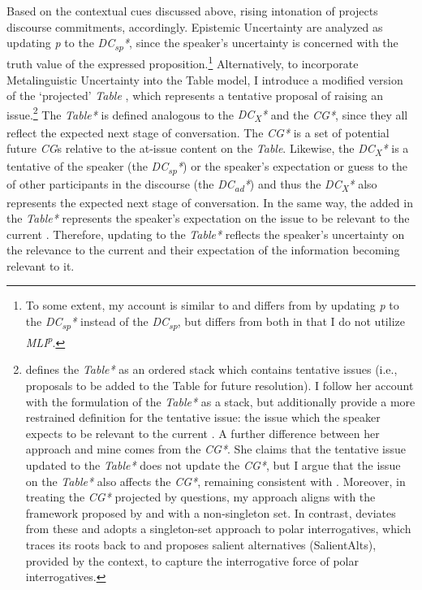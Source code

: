 \documentclass[output=paper,colorlinks,citecolor=brown]{langscibook}
\begin{document}
Based on the contextual cues discussed above, rising intonation of  projects discourse commitments, accordingly. Epistemic Uncertainty  are analyzed as updating \textit{p} to the \textit{DC\textsubscript{sp}*}, since the speaker's uncertainty is concerned with the truth value of the expressed proposition.\footnote{To some extent, my account is similar to \citet{malamud2015three} and differs from \citet{jeong2018intonation}  by updating \textit{p} to the \textit{DC\textsubscript{sp}*} instead of the \textit{DC\textsubscript{sp}}, but differs from both in that I do not utilize \textit{MLI\textsuperscript{p}}.} Alternatively, to incorporate Metalinguistic Uncertainty  into the Table model, I introduce a modified version of the `projected' \textit{Table} \citep[henceforth, \textit{Table*};][]{malamud2012three, bhadra2020semantics}, which represents a tentative proposal of raising an issue.\footnote{\citet{bhadra2020semantics} defines the \textit{Table*} as an ordered stack which contains tentative issues (i.e., proposals to be added to the Table for future resolution). I follow her account with the formulation of the \textit{Table*} as a stack, but additionally provide a more restrained definition for the tentative issue: the issue which the speaker expects to be relevant to the current . A further difference between her approach and mine comes from the \textit{CG*}. She claims that the tentative issue updated to the \textit{Table*} does not update the \textit{CG*}, but I argue that the issue on the \textit{Table*} also affects the \textit{CG*}, remaining consistent with \citet{malamud2012three}. Moreover, in treating the \textit{CG*} projected by questions, my approach aligns with the framework proposed by \citet{farkas2010reacting} and \citet{malamud2015three} with a non-singleton set. In contrast, \citet{bhadra2020semantics} deviates from these and adopts a singleton-set approach to polar interrogatives, which traces its roots back to \citet{bolinger1978yes} and proposes salient alternatives (SalientAlts), provided by the context, to capture the interrogative force of polar interrogatives.}  The \textit{Table*} is defined analogous to the \textit{DC\textsubscript{X}*} and the \textit{CG*}, since they all reflect the expected next stage of conversation. The \textit{CG*} is a set of potential future \textit{CG}s relative to the at-issue content on the \textit{Table}. Likewise, the \textit{DC\textsubscript{X}*} is a tentative  of the speaker (the \textit{DC\textsubscript{sp}*}) or the speaker’s expectation or guess to the  of other participants in the discourse (the \textit{DC\textsubscript{ad}*}) and thus the \textit{DC\textsubscript{X}*} also represents the expected next stage of conversation. In the same way, the  added in the \textit{Table*} represents the speaker’s expectation on the issue to be relevant to the current . Therefore, updating  to the \textit{Table*} reflects the speaker’s uncertainty on the relevance to the current  \citep{roberts1996information, roberts2012information} and their expectation of the information becoming relevant to it. 
\end{document}
